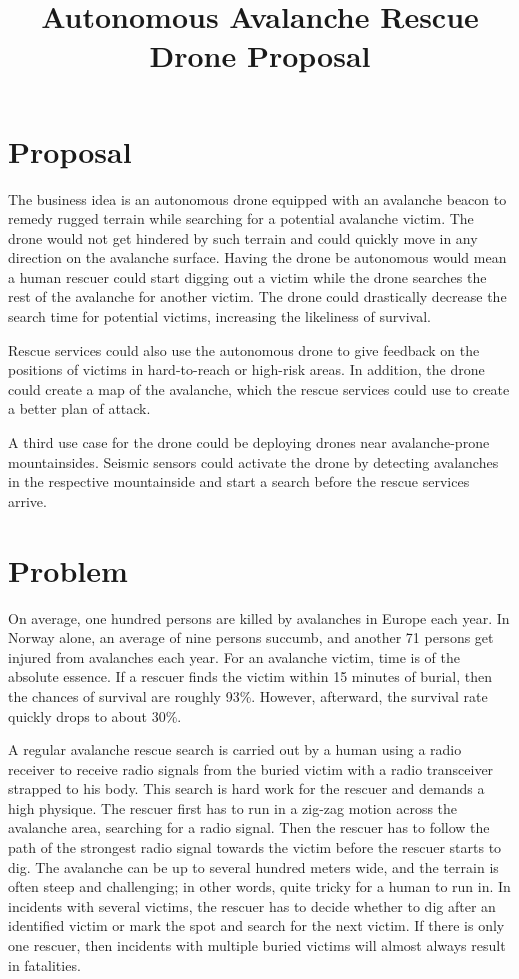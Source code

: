\documentclass{article}
\title{Autonomous Avalanche Rescue Drone Proposal}
\begin{document}
\maketitle

\section*{Proposal}
The business idea is an autonomous drone equipped with an avalanche beacon to remedy rugged terrain while searching for a potential avalanche victim. The drone would not get hindered by such terrain and could quickly move in any direction on the avalanche surface. Having the drone be autonomous would mean a human rescuer could start digging out a victim while the drone searches the rest of the avalanche for another victim. 
The drone could drastically decrease the search time for potential victims, increasing the likeliness of survival.

Rescue services could also use the autonomous drone to give feedback on the positions of victims in hard-to-reach or high-risk areas. In addition, the drone could create a map of the avalanche, which the rescue services could use to create a better plan of attack.

A third use case for the drone could be deploying drones near avalanche-prone mountainsides. Seismic sensors could activate the drone by detecting avalanches in the respective mountainside and start a search before the rescue services arrive.

\section*{Problem}
On average, one hundred persons are killed by avalanches in Europe each year\cite{avalancheStat}. In Norway alone, an average of nine persons succumb, and another 71 persons get injured from avalanches\cite{varsomStat} each year. For an avalanche victim, time is of the absolute essence. If a rescuer finds the victim within 15 minutes of burial, then the chances of survival are roughly 93\%. However, afterward, the survival rate quickly drops to about 30\%. 

A regular avalanche rescue search is carried out by a human using a radio receiver to receive radio signals from the buried victim with a radio transceiver strapped to his body. This search is hard work for the rescuer and demands a high physique. The rescuer first has to run in a zig-zag motion across the avalanche area, searching for a radio signal. Then the rescuer has to follow the path of the strongest radio signal towards the victim before the rescuer starts to dig. The avalanche can be up to several hundred meters wide, and the terrain is often steep and challenging; in other words, quite tricky for a human to run in. In incidents with several victims, the rescuer has to decide whether to dig after an identified victim or mark the spot and search for the next victim. If there is only one rescuer, then incidents with multiple buried victims will almost always result in fatalities.
\end{document}
